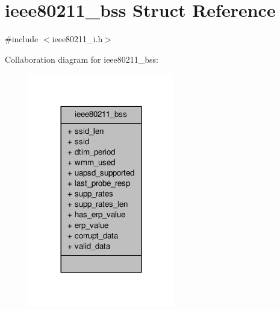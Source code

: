 \hypertarget{structieee80211__bss}{\section{ieee80211\-\_\-bss Struct Reference}
\label{structieee80211__bss}
}


{\ttfamily \#include $<$ieee80211\-\_\-i.\-h$>$}



Collaboration diagram for ieee80211\-\_\-bss\-:
\nopagebreak
\begin{figure}[H]
\begin{center}
\leavevmode
\includegraphics[width=180pt]{structieee80211__bss__coll__graph}
\end{center}
\end{figure}
